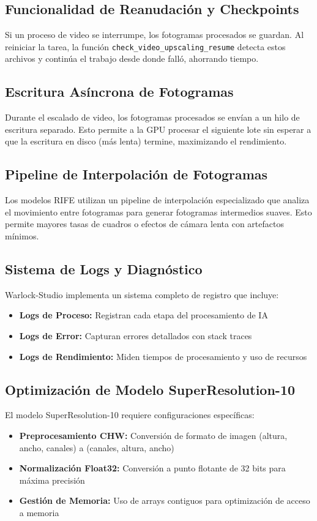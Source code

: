 \documentclass[11pt, a4paper]{article}
\newcommand{\inlinecode}[1]{\colorbox{WarlockLightGray}{\small\texttt{#1}}}
\begin{document}
\subsection{Funcionalidad de Reanudación y Checkpoints}
Si un proceso de video se interrumpe, los fotogramas procesados se guardan. Al reiniciar la tarea, la función \inlinecode{check\_video\_upscaling\_resume} detecta estos archivos y continúa el trabajo desde donde falló, ahorrando tiempo.

\subsection{Escritura Asíncrona de Fotogramas}
Durante el escalado de video, los fotogramas procesados se envían a un hilo de escritura separado. Esto permite a la GPU procesar el siguiente lote sin esperar a que la escritura en disco (más lenta) termine, maximizando el rendimiento.

\subsection{Pipeline de Interpolación de Fotogramas}
Los modelos RIFE utilizan un pipeline de interpolación especializado que analiza el movimiento entre fotogramas para generar fotogramas intermedios suaves. Esto permite mayores tasas de cuadros o efectos de cámara lenta con artefactos mínimos.

\subsection{Sistema de Logs y Diagnóstico}
Warlock-Studio implementa un sistema completo de registro que incluye:
\begin{itemize}[leftmargin=*]
    \item \textbf{Logs de Proceso:} Registran cada etapa del procesamiento de IA
    \item \textbf{Logs de Error:} Capturan errores detallados con stack traces
    \item \textbf{Logs de Rendimiento:} Miden tiempos de procesamiento y uso de recursos
\end{itemize}

\subsection{Optimización de Modelo SuperResolution-10}
El modelo SuperResolution-10 requiere configuraciones específicas:
\begin{itemize}[leftmargin=*]
    \item \textbf{Preprocesamiento CHW:} Conversión de formato de imagen (altura, ancho, canales) a (canales, altura, ancho)
    \item \textbf{Normalización Float32:} Conversión a punto flotante de 32 bits para máxima precisión
    \item \textbf{Gestión de Memoria:} Uso de arrays contiguos para optimización de acceso a memoria
\end{itemize}
\end{document}
